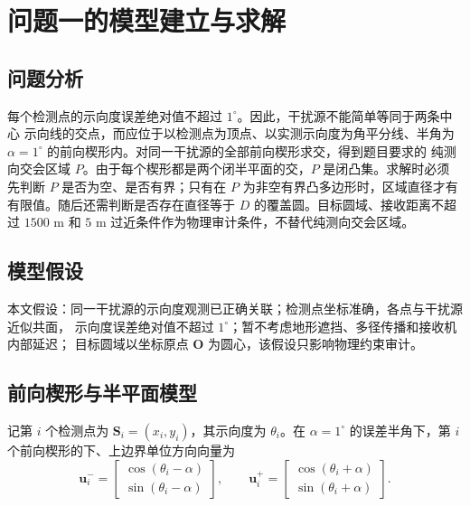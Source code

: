 \documentclass[withoutpreface,notoc]{cumcmthesis}
\newcommand{\bs}{\boldsymbol{S}}
\newcommand{\bu}{\boldsymbol{u}}
\newcommand{\bO}{\boldsymbol{O}}
\begin{document}

\section{问题一的模型建立与求解}

\subsection{问题分析}

每个检测点的示向度误差绝对值不超过 $1^\circ$。因此，干扰源不能简单等同于两条中心
示向线的交点，而应位于以检测点为顶点、以实测示向度为角平分线、半角为
$\alpha=1^\circ$ 的前向楔形内。对同一干扰源的全部前向楔形求交，得到题目要求的
纯测向交会区域 $P$。由于每个楔形都是两个闭半平面的交，$P$ 是闭凸集。求解时必须
先判断 $P$ 是否为空、是否有界；只有在 $P$ 为非空有界凸多边形时，区域直径才有
有限值。随后还需判断是否存在直径等于 $D$ 的覆盖圆。目标圆域、接收距离不超过
$1500$ m 和 $5$ m 过近条件作为物理审计条件，不替代纯测向交会区域。

\subsection{模型假设}

本文假设：同一干扰源的示向度观测已正确关联；检测点坐标准确，各点与干扰源近似共面，
示向度误差绝对值不超过 $1^\circ$；暂不考虑地形遮挡、多径传播和接收机内部延迟；
目标圆域以坐标原点 $\bO$ 为圆心，该假设只影响物理约束审计。

\subsection{前向楔形与半平面模型}

记第 $i$ 个检测点为 $\bs_i=(x_i,y_i)$，其示向度为 $\theta_i$。在
$\alpha=1^\circ$ 的误差半角下，第 $i$ 个前向楔形的下、上边界单位方向向量为
\begin{equation}
  \bu_i^-=
  \begin{bmatrix}
    \cos(\theta_i-\alpha)\\
    \sin(\theta_i-\alpha)
  \end{bmatrix},
  \qquad
  \bu_i^+=
  \begin{bmatrix}
    \cos(\theta_i+\alpha)\\
    \sin(\theta_i+\alpha)
  \end{bmatrix}.
  \label{eq:boundary-vectors}
\end{equation}
\end{document}
